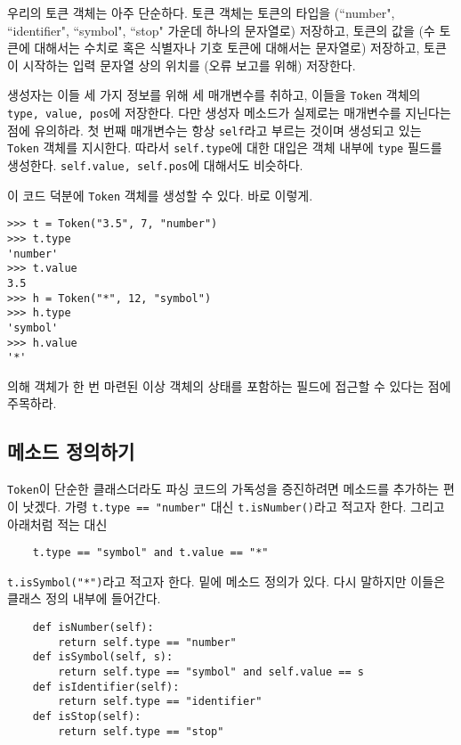 \documentclass[a4paper]{oblivoir}
\begin{document}
우리의 토큰 객체는 아주 단순하다. 토큰 객체는 토큰의 타입을 (``number", ``identifier", ``symbol", ``stop" 가운데 하나의 문자열로) 저장하고, 토큰의 값을 (수 토큰에 대해서는 수치로 혹은 식별자나 기호 토큰에 대해서는 문자열로) 저장하고, 토큰이 시작하는 입력 문자열 상의 위치를 (오류 보고를 위해) 저장한다.

생성자는 이들 세 가지 정보를 위해 세 매개변수를 취하고, 이들을 \texttt{Token} 객체의  \texttt{type, value, pos}에 저장한다. 다만 생성자 메소드가 실제로는  매개변수를 지닌다는 점에 유의하라. 첫 번째 매개변수는 항상 \texttt{self}라고 부르는 것이며 생성되고 있는 \texttt{Token} 객체를 지시한다. 따라서 \texttt{self.type}에 대한 대입은 객체 내부에 \texttt{type} 필드를 생성한다. \texttt{self.value, self.pos}에 대해서도 비슷하다.

이 코드 덕분에 \texttt{Token} 객체를 생성할 수 있다. 바로 이렇게.

\begin{lstlisting}
>>> t = Token("3.5", 7, "number")
>>> t.type
'number'
>>> t.value
3.5
>>> h = Token("*", 12, "symbol")
>>> h.type
'symbol'
>>> h.value
'*'
\end{lstlisting}

 의해 객체가 한 번 마련된 이상 객체의 상태를 포함하는 필드에 접근할 수 있다는 점에 주목하라.

\subsection*{메소드 정의하기}

\texttt{Token}이 단순한 클래스더라도 파싱 코드의 가독성을 증진하려면 메소드를 추가하는 편이 낫겠다. 가령 \texttt{t.type == "number"} 대신 \texttt{t.isNumber()}라고 적고자 한다. 그리고 아래처럼 적는 대신

\begin{verbatim}
    t.type == "symbol" and t.value == "*"
\end{verbatim}

\noindent\texttt{t.isSymbol("*")}라고 적고자 한다. 밑에 메소드 정의가 있다. 다시 말하지만 이들은 클래스 정의 내부에 들어간다.

\begin{verbatim}
    def isNumber(self):
        return self.type == "number"
    def isSymbol(self, s):
        return self.type == "symbol" and self.value == s
    def isIdentifier(self):
        return self.type == "identifier"
    def isStop(self):
        return self.type == "stop"
\end{verbatim}
\end{document}
